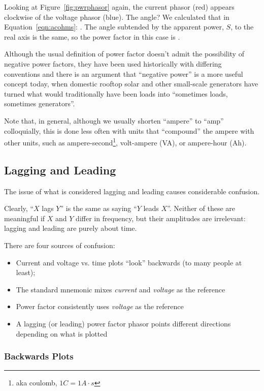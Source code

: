 \documentclass[11pt]{article}
\begin{document}
Looking at Figure~\ref{fig:pwrphasor} again, the current phasor (red)
appears clockwise of the voltage phasor (blue). The angle? We
calculated that in Equation~\ref{eqn:acohms}: \ruArgZ. The angle
subtended by the apparent power, $S$, to the real axis is the same, so
the power factor in this case is \rnPF.

Although the usual definition of power factor doesn't admit the
possibility of negative power factors, they have been used
historically with differing conventions and there is an argument that
``negative power'' is a more useful concept today, when domestic
rooftop solar and other small-scale generators have turned what would
traditionally have been loads into ``sometimes loads, sometimes
generators''.

Note that, in general, although we usually shorten ``ampere'' to
``amp'' colloquially, this is done less often with units that
``compound'' the ampere with other units, such as
ampere-second\footnote{aka coulomb, $1\unit{C}=1\unit{A\cdot s}$},
volt-ampere (\unit{VA}), or ampere-hour (\unit{Ah}).


\subsection{Lagging and Leading}

The issue of what is considered lagging and leading causes
considerable confusion.

Clearly, ``$X$ lags $Y$'' is the same as saying ``$Y$ leads
$X$''. Neither of these are meaningful if $X$ and $Y$ differ in
frequency, but their amplitudes are irrelevant: lagging and leading
are purely about time.

There are four sources of confusion:
\begin{itemize}
  \item Current and voltage vs. time plots ``look'' backwards (to many people at least);
  \item The standard mnemonic mixes \emph{current} and \emph{voltage} as the reference
  \item Power factor consistently uses \emph{voltage} as the reference
  \item A lagging (or leading) power factor phasor points different
    directions depending on what is plotted
\end{itemize}

\subsubsection{Backwards Plots}
\end{document}
